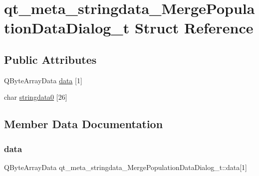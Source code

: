 \hypertarget{structqt__meta__stringdata___merge_population_data_dialog__t}{}\section{qt\+\_\+meta\+\_\+stringdata\+\_\+\+Merge\+Population\+Data\+Dialog\+\_\+t Struct Reference}
\label{structqt__meta__stringdata___merge_population_data_dialog__t}
\subsection*{Public Attributes}
\begin{DoxyCompactItemize}
\item 
Q\+Byte\+Array\+Data \mbox{\hyperlink{structqt__meta__stringdata___merge_population_data_dialog__t_a78aad50cc3f7d60626b54f623f00bab6}{data}} \mbox{[}1\mbox{]}
\item 
char \mbox{\hyperlink{structqt__meta__stringdata___merge_population_data_dialog__t_a07859a65e638d4616e6fcbe5661256f1}{stringdata0}} \mbox{[}26\mbox{]}
\end{DoxyCompactItemize}


\subsection{Member Data Documentation}
\mbox{\label{structqt__meta__stringdata___merge_population_data_dialog__t_a78aad50cc3f7d60626b54f623f00bab6}} 
\subsubsection{\texorpdfstring{data}{data}}
{\footnotesize\ttfamily Q\+Byte\+Array\+Data qt\+\_\+meta\+\_\+stringdata\+\_\+\+Merge\+Population\+Data\+Dialog\+\_\+t\+::data\mbox{[}1\mbox{]}}

\mbox{\label{structqt__meta__stringdata___merge_population_data_dialog__t_a07859a65e638d4616e6fcbe5661256f1}} 
